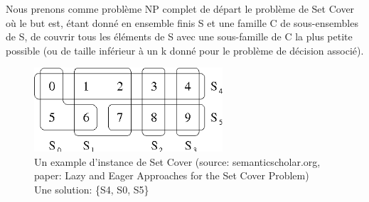 \documentclass{article}
\begin{document}
Nous prenons comme problème NP complet de départ le problème de Set Cover où le but est, étant donné en ensemble finis S et une famille C de sous-ensembles de S, de couvrir tous les éléments de S avec une sous-famille de C la plus petite possible (ou de taille inférieur à un k donné pour le problème de décision associé). 
\begin{figure}[!h]
	\centerline{ \includegraphics[width=7cm]{images/setcover.png}}
	\caption{Un example d'instance de Set Cover (source: semanticscholar.org, paper: Lazy and Eager Approaches for the Set Cover Problem) \\ Une solution: \{S4, S0, S5\}}
\end{figure}
\\ \par
\end{document}
